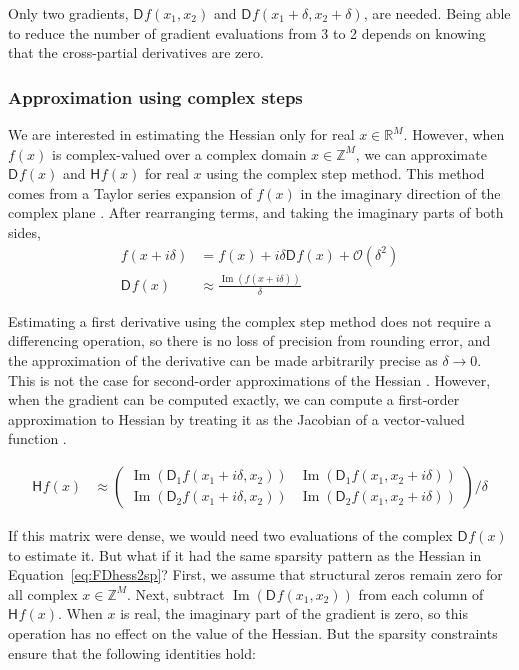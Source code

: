 \documentclass[jss]{jss}\usepackage[]{graphicx}\usepackage[]{color}
\newcommand{\parD}[3]{\mathsf{D}^{#1}_{#2}#3}
\newcommand{\hess}[2]{\mathsf{H}_{#1}#2}
\newcommand{\Real}[1]{\mathbb{R}^{#1}}
\newcommand{\Complex}[1]{\mathbb{Z}^{#1}}
\DeclareMathOperator{\Imag}{Im}
\begin{document}
Only two gradients,
${\parD{}{}{f(x_1,x_2)}}$ and ${\parD{}{}{f(x_1+\delta,x_2+\delta)}}$,
are needed.
Being able to reduce the number of gradient evaluations from 3 to 2 depends on knowing that
the cross-partial derivatives are zero.

\subsubsection[Approximation using complex steps]{Approximation using complex steps}

We are interested in estimating the Hessian only for real
$x\in\Real{M}$. However, when $f(x)$ is complex-valued over a complex domain $x\in\Complex{M}$, we can approximate $\parD{}{}{f(x)}$
and $\hess{}{f(x)}$ for real $x$ using the complex step
method.  This method comes from a Taylor
series expansion of $f(x)$ in the imaginary direction of the complex
plane \citep{SquireTrapp1998}.  After rearranging terms, and taking the imaginary
parts of both sides,
\begin{align}
  \label{eq:complexTaylor}
  f(x+i\delta)&=f(x) + i\delta\parD{}{}{f(x)}+\mathcal{O}(\delta^2)\\
  \parD{}{}{f(x)}&\approx\frac{\Imag(f(x+i\delta))}{\delta}
\end{align}

Estimating a first derivative using the complex step method does not
require a differencing operation, so there is no loss of precision
from rounding error, and the approximation of the derivative can be
made arbitrarily precise as $\delta\rightarrow 0$.  This is not the
case for second-order approximations of
the Hessian \citep{AbreuStich2013}.  However, when the gradient can be
computed exactly, we can compute a first-order approximation to
Hessian by treating it as the Jacobian of
a vector-valued function \citep{LaiCrassidis2008}.

\begin{align}
  \label{eq:CShess2}
  \hess{}{f(x)}&\approx
  \begin{pmatrix}
    \Imag(\parD{}{1}{f(x_1+i\delta, x_2)})& \Imag(\parD{}{1}{f(x_1,x_2+i\delta)})\\
        \Imag(\parD{}{2}{f(x_1+i\delta, x_2)})&\Imag(\parD{}{2}{f(x_1,x_2+i\delta)})
    \end{pmatrix}/\delta
\end{align}

If this matrix were dense, we would need two evaluations of the
complex $\parD{}{}f(x)$ to estimate it.  But what if it had the same sparsity
pattern as the Hessian in Equation~\ref{eq:FDhess2sp}? First, we
assume that structural zeros remain zero for all
complex $x\in\Complex{M}$.  Next, subtract
$\Imag(\parD{}{}{f(x_1,x_2)})$ from each column of
$\hess{}{f(x)}$. When $x$ is real, the imaginary part of the gradient
is zero, so this operation has no effect on the value of the
Hessian. But the sparsity constraints ensure that
the following identities hold:
\end{document}
